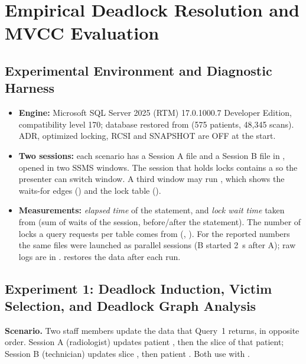 \section{Empirical Deadlock Resolution and MVCC Evaluation}
\label{sec:r5-2-experiments}

\subsection{Experimental Environment and Diagnostic Harness}
\label{sec:r5-2-setup}

\begin{itemize}
  \item \textbf{Engine:} Microsoft SQL Server 2025 (RTM) 17.0.1000.7 Developer Edition, compatibility level 170; database restored from  (575 patients, 48{,}345 scans). ADR, optimized locking, RCSI and SNAPSHOT are OFF at the start.
  \item \textbf{Two sessions:} each scenario has a Session A file and a Session B file in , opened in two SSMS windows. The session that holds locks contains a  so the presenter can switch window. A third window may run , which shows the waits-for edges () and the lock table ().
  \item \textbf{Measurements:} \emph{elapsed time} of the statement, and \emph{lock wait time} taken from  (sum of  waits of the session, before/after the statement). The number of locks a query requests per table comes from  (, ). For the reported numbers the same files were launched as parallel  sessions (B started 2~s after A); raw logs are in .  restores the data after each run.
\end{itemize}

\subsection{Experiment 1: Deadlock Induction, Victim Selection, and Deadlock Graph Analysis}
\label{sec:r5-2-deadlock}

\textbf{Scenario.} Two staff members update the data that Query~1 returns, in opposite order. Session A (radiologist) updates patient , then the slice  of that patient; Session B (technician) updates slice , then patient . Both use  with .

